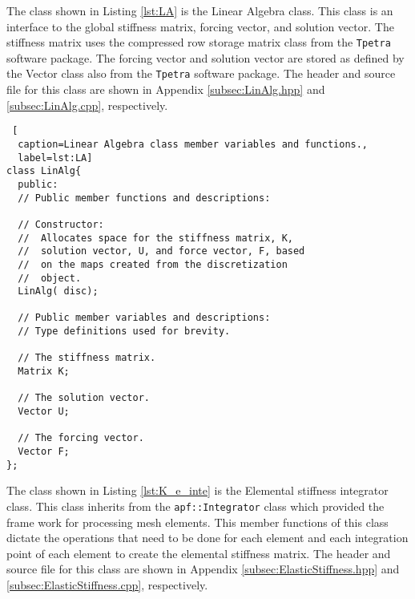 \documentclass[a4paper, 12pt]{article}
\begin{document}
The class shown in Listing
\ref{lst:LA} is the
Linear Algebra
class.
This class is an interface to the global stiffness matrix, forcing
vector, and solution vector. The stiffness matrix uses the
compressed row storage matrix class from the \texttt{Tpetra}
software package. The forcing vector and solution vector are
stored as defined by the Vector class also from the \texttt{Tpetra}
software package.
The header and source file for this class are shown in Appendix
\ref{subsec:LinAlg.hpp} and
\ref{subsec:LinAlg.cpp},
respectively.

\begin{lstlisting} [
  caption=Linear Algebra class member variables and functions.,
  label=lst:LA]
class LinAlg{
  public:
  // Public member functions and descriptions:

  // Constructor:
  //  Allocates space for the stiffness matrix, K,
  //  solution vector, U, and force vector, F, based
  //  on the maps created from the discretization
  //  object.
  LinAlg( disc);

  // Public member variables and descriptions:
  // Type definitions used for brevity.

  // The stiffness matrix.
  Matrix K;

  // The solution vector.
  Vector U;

  // The forcing vector.
  Vector F;
};
\end{lstlisting}
\vspace{\baselineskip}

The class shown in Listing
\ref{lst:K_e_inte} is the
Elemental stiffness integrator
class.
This class inherits from the \texttt{apf::Integrator} class
which provided the frame work for processing mesh elements.
This member functions of this class dictate the operations that
need to be done for each element and each integration point
of each element to create the elemental stiffness matrix.
The header and source file for this class are shown in Appendix
\ref{subsec:ElasticStiffness.hpp} and
\ref{subsec:ElasticStiffness.cpp},
respectively.
\end{document}
